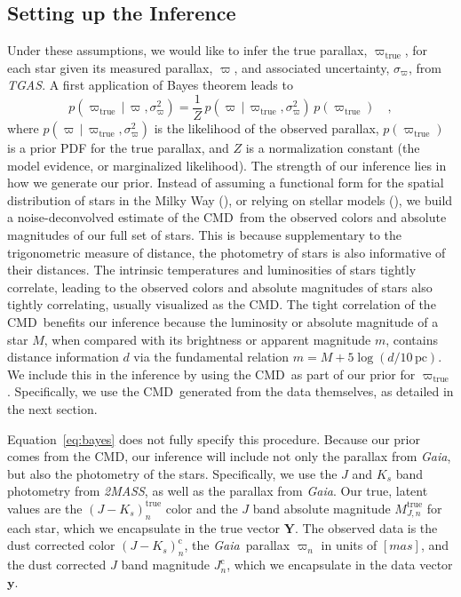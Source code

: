 \documentclass[modern]{aastex61}
\newcommand{\acronym}[1]{{\small{#1}}}
\newcommand{\project}[1]{\textsl{#1}}
\newcommand{\tgas}{\project{\acronym{TGAS}}}
\newcommand{\tmass}{\project{\acronym{2MASS}}}
\newcommand{\gaia}{\project{Gaia}}
\newcommand{\cmd}{\acronym{CMD}}
\newcommand{\given}{\,|\,}
\newcommand{\true}{\mathrm{true}}
\newcommand{\corr}{\mathrm{c}}
\renewcommand{\vec}[1]{\boldsymbol{{#1}}}
\newcommand{\truth}{\vec{Y}}
\newcommand{\data}{\vec{y}}
\begin{document}
\subsection{Setting up the Inference}

Under these assumptions, we would like to infer the true parallax, $\varpi_{\true}$, for each star given its measured parallax, $\varpi$, and associated uncertainty, $\sigma_{\varpi}$, from \tgas.
A first application of Bayes theorem leads to
\begin{equation}
p(\varpi_{\true} \given \varpi, \sigma^2_{\varpi}) = \frac{1}{Z}\,p(\varpi \given \varpi_{\true}, \sigma^2_{\varpi}) \, p(\varpi_{\true}) \quad ,
\label{eq:bayes}
\end{equation}
where $p(\varpi \given \varpi_{\true}, \sigma^2_{\varpi})$ is the likelihood of the observed parallax, $p(\varpi_{\true})$ is a prior PDF for the true
parallax, and $Z$ is a normalization constant (the model evidence, or marginalized likelihood).
The strength of our inference lies in how we generate our prior.
Instead of assuming a functional form for the spatial distribution of stars in the Milky Way (\citealt{astraatmadja16b}), or relying on stellar models (\citealt{gaia16}), we build a noise-deconvolved estimate of the \cmd\ from the observed colors and absolute magnitudes of our full set of stars.
This is because supplementary to the trigonometric measure of distance, the photometry of stars is also informative of their distances.
The intrinsic temperatures and luminosities of stars tightly correlate, leading to the observed colors and absolute magnitudes of stars also tightly correlating, usually visualized as the \cmd.
The tight correlation of the \cmd\ benefits our inference because the luminosity or absolute magnitude of a star $M$, when compared with its brightness or apparent magnitude $m$, contains distance information $d$ via the fundamental relation $m=M+5\log(d/10\, \mathrm{pc})$.
We include this in the inference by using the \cmd\ as part of our prior for $\varpi_{\true}$.
Specifically, we use the \cmd\ generated from the data themselves, as detailed in the next section.

Equation~\ref{eq:bayes} does not fully specify this procedure.
Because our prior comes from the \cmd, our inference will include not only the parallax from \gaia, but also the photometry of the stars. Specifically, we use the $J$ and $K_s$ band photometry from \tmass, as well as the parallax from \gaia. Our true, latent values are the $(J-K_s)^{\true}_n$ color and the $J$ band absolute magnitude $M^{\true}_{J,n}$ for each star, which we encapsulate in the true vector $\truth$. The observed data is the dust corrected color $(J-K_s)^{\corr}_n$, the \gaia\ parallax $\varpi_n$ in units of $[mas]$, and the dust corrected $J$ band magnitude $J^{\corr}_n$, which we encapsulate in the data vector $\data$.
\end{document}
